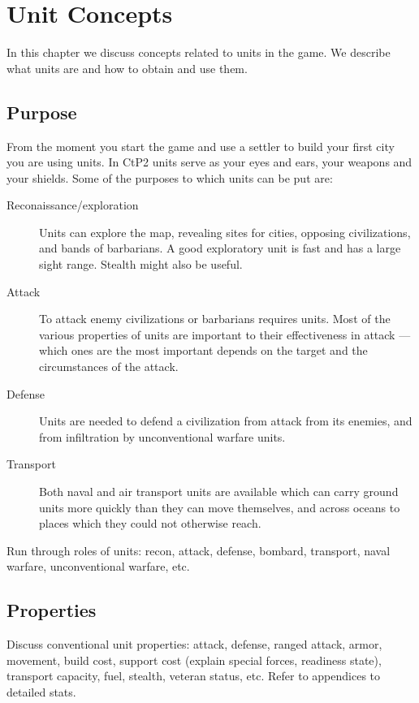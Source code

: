\chapter{Unit Concepts}

In this chapter we discuss concepts related to units in the game.  We describe
what units are and how to obtain and use them.

\section{Purpose}

From the moment you start the game and use a settler to build your first city
you are using units.  In CtP2 units serve as your eyes and ears, your
weapons and your shields.  Some of the purposes to which units can be put are:

\begin{description}
\item[Reconaissance/exploration] Units can explore the map, revealing sites for
cities, opposing civilizations, and bands of barbarians.  A good
exploratory unit is fast and has a large sight range.  Stealth might also be
useful.
\item[Attack] To attack enemy civilizations or barbarians requires
units.  Most of the various properties of units are important to their
effectiveness in attack --- which ones are the most important depends on the
target and the circumstances of the attack.
\item[Defense] Units are needed to defend a civilization from attack from its
enemies, and from infiltration by unconventional warfare units.
\item[Transport] Both naval and air transport units are available which can
carry ground units more quickly than they can move themselves, and across
oceans to places which they could not otherwise reach.
\end{description}

Run through roles of units: recon, attack, defense, bombard, transport, naval
warfare, unconventional warfare, etc.

\section{Properties}

Discuss conventional unit properties: attack, defense, ranged attack, armor,
movement, build cost, support cost (explain special forces, readiness state),
transport capacity, fuel, stealth, veteran status, etc. Refer to appendices to
detailed stats.

